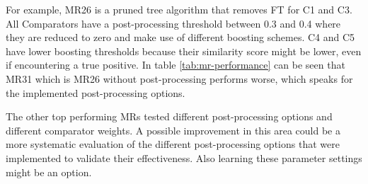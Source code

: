 \documentclass[11pt,titlepage,oneside,openany]{article}
\begin{document}
For example, MR26  is a pruned tree algorithm that removes FT for C1 and C3. All Comparators have a post-processing threshold between 0.3 and 0.4 where they are reduced to zero and make use of different boosting schemes. C4 and C5 have lower boosting thresholds because their similarity score might be lower, even if encountering a true positive. In table \ref{tab:mr-performance} can be seen that MR31 which is MR26 without post-processing performs worse, which speaks for the implemented post-processing options.

The other top performing MRs tested different post-processing options and different comparator weights. A possible improvement in this area could be a more systematic evaluation of the different post-processing options that were implemented to validate their effectiveness. Also learning these parameter settings might be an option.
\end{document}
